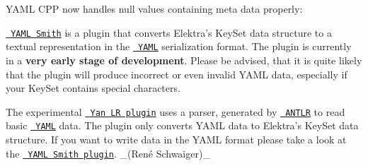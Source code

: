 \begin{DoxyCode}{0}
\DoxyCodeLine{\#> []}
\end{DoxyCode}



\begin{DoxyItemize}
\item Y\+A\+ML C\+PP now handles null values containing meta data properly\+:
\end{DoxyItemize}


\begin{DoxyCode}{0}
\DoxyCodeLine{\#> - ~}
\end{DoxyCode}



\begin{DoxyItemize}
\item \href{http://libelektra.org/plugins/yamlsmith}{\texttt{ Y\+A\+ML Smith}} is a plugin that converts Elektra’s {\ttfamily Key\+Set} data structure to a textual representation in the \href{http://yaml.org}{\texttt{ Y\+A\+ML}} serialization format. The plugin is currently in a {\bfseries{very early stage of development}}. Please be advised, that it is quite likely that the plugin will produce incorrect or even invalid Y\+A\+ML data, especially if your {\ttfamily Key\+Set} contains special characters.
\end{DoxyItemize}


\begin{DoxyItemize}
\item The experimental \href{http://libelektra.org/plugins/yanlr}{\texttt{ Yan LR plugin}} uses a parser, generated by \href{http://www.antlr.org}{\texttt{ A\+N\+T\+LR}} to read basic \href{http://yaml.org}{\texttt{ Y\+A\+ML}} data. The plugin only converts Y\+A\+ML data to Elektra’s {\ttfamily Key\+Set} data structure. If you want to write data in the Y\+A\+ML format please take a look at the \href{http://libelektra.org/plugins/yamlsmith}{\texttt{ Y\+A\+ML Smith plugin}}. \+\_\+(René Schwaiger)\+\_\+
\end{DoxyItemize}


